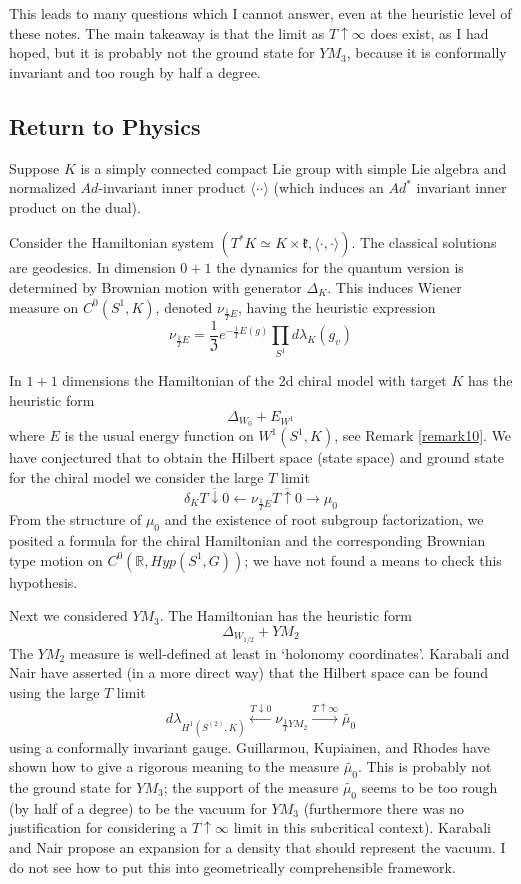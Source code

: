 \documentclass{amsart}
\theoremstyle{conjecture}
\theoremstyle{definition}
\theoremstyle{question}
\theoremstyle{questions}
\theoremstyle{remark}
\theoremstyle{remarks}
\theoremstyle{example}
\numberwithin{equation}{section}
\begin{document}
This leads to many questions which I cannot answer, even at the heuristic level of these notes. The main takeaway is that the limit as $T\uparrow \infty$
does exist, as I had hoped, but it is probably not the ground state for $YM_3$, because it is conformally invariant and too rough by half a degree. 

\subsection{Return to Physics}

Suppose $K$ is a simply connected compact Lie group with simple Lie algebra and normalized $Ad$-invariant inner product $\langle \cdot\cdot\rangle$ (which
induces an $Ad^*$ invariant inner product on the dual). 

Consider the Hamiltonian system $(T^*K\simeq K\times \mathfrak k, \langle\cdot,\cdot\rangle)$. The classical solutions are geodesics. 
In dimension $0+1$ the dynamics for the quantum version is determined by Brownian motion with generator $\Delta_K$. This induces Wiener measure
on $C^0(S^1,K)$, denoted $\nu_{\frac 1T E}$, having the heuristic expression
$$\nu_{\frac 1T E}=\frac {1}{\mathfrak Z}e^{-\frac 1T E(g)}\prod_{S^1} d\lambda_K(g_v)$$

In $1+1$ dimensions the Hamiltonian of the 2d chiral model with target $K$
has the heuristic form
$$\Delta_{W_0}+E_{W^1}$$
where $E$ is the usual energy function on $W^1(S^1,K)$, see Remark \ref{remark10}. We have conjectured that to obtain the Hilbert space (state space) 
and ground state for the chiral model
we consider the large $T$ limit
$$ \delta_K \overline{T\downarrow 0}{\leftarrow}  \nu_{\frac 1T E} \overline{T\uparrow 0}{\rightarrow} \mu_0 $$
From the structure of $\mu_0$ and the existence of root subgroup factorization, we posited a formula for the chiral Hamiltonian and the corresponding
Brownian type motion on $C^0(\mathbb R,Hyp(S^1,G))$; we have not found a means to check this hypothesis.

Next we considered $YM_3$. The Hamiltonian has the heuristic form
$$\Delta_{W_{1/2}}+YM_2$$
The $YM_2$ measure is well-defined at least in `holonomy coordinates'. Karabali and Nair have asserted (in a more direct way) that the Hilbert space 
can be found using the large $T$ limit
$$d\lambda_{H^1(S^{(2)},K)} \stackrel{T\downarrow 0}{\leftarrow} \nu_{\frac 1T YM_2} \stackrel{T\uparrow \infty}{\rightarrow} \widetilde{\mu_0}$$
using a conformally invariant gauge. Guillarmou, Kupiainen, and Rhodes have shown how to give a rigorous meaning to the measure $\widetilde{\mu_0}$.
This is probably not the ground state for $YM_3$; the support of the measure $\widetilde{\mu_0}$ seems to be too rough (by half of a degree) to be the vacuum for $YM_3$ (furthermore
there was no justification for considering a $T\uparrow \infty$ limit in this subcritical context). Karabali and Nair
propose an expansion for a density that should represent the vacuum. I do not see how to put this into geometrically comprehensible framework.
\end{document}
